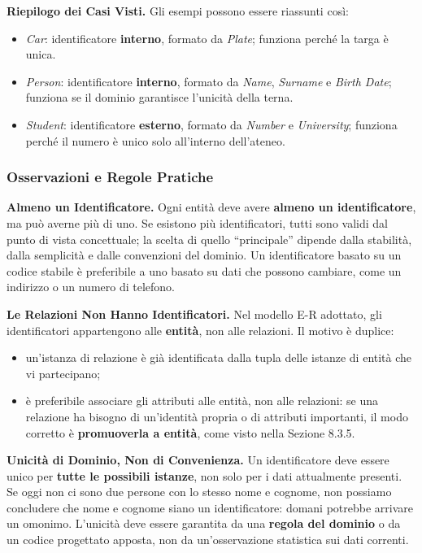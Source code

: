 \documentclass[12pt]{extarticle}
\begin{document}
\noindent \textbf{Riepilogo dei Casi Visti.} Gli esempi possono essere riassunti così:
\begin{itemize}
    \item \textit{Car}: identificatore \textbf{interno}, formato da \textit{Plate}; funziona perché la targa è unica.
    \item \textit{Person}: identificatore \textbf{interno}, formato da \textit{Name}, \textit{Surname} e \textit{Birth Date}; funziona se il dominio garantisce l'unicità della terna.
    \item \textit{Student}: identificatore \textbf{esterno}, formato da \textit{Number} e \textit{University}; funziona perché il numero è unico solo all'interno dell'ateneo.
\end{itemize}

\subsubsection{Osservazioni e Regole Pratiche}

\noindent \textbf{Almeno un Identificatore.} Ogni entità deve avere \textbf{almeno un identificatore}, ma può averne più di uno. Se esistono più identificatori, tutti sono validi dal punto di vista concettuale; la scelta di quello ``principale'' dipende dalla stabilità, dalla semplicità e dalle convenzioni del dominio. Un identificatore basato su un codice stabile è preferibile a uno basato su dati che possono cambiare, come un indirizzo o un numero di telefono.

\medskip
\noindent \textbf{Le Relazioni Non Hanno Identificatori.} Nel modello E-R adottato, gli identificatori appartengono alle \textbf{entità}, non alle relazioni. Il motivo è duplice:
\begin{itemize}
    \item un'istanza di relazione è già identificata dalla tupla delle istanze di entità che vi partecipano;
    \item è preferibile associare gli attributi alle entità, non alle relazioni: se una relazione ha bisogno di un'identità propria o di attributi importanti, il modo corretto è \textbf{promuoverla a entità}, come visto nella Sezione 8.3.5.
\end{itemize}

\medskip
\noindent \textbf{Unicità di Dominio, Non di Convenienza.} Un identificatore deve essere unico per \textbf{tutte le possibili istanze}, non solo per i dati attualmente presenti. Se oggi non ci sono due persone con lo stesso nome e cognome, non possiamo concludere che nome e cognome siano un identificatore: domani potrebbe arrivare un omonimo. L'unicità deve essere garantita da una \textbf{regola del dominio} o da un codice progettato apposta, non da un'osservazione statistica sui dati correnti.
\end{document}
